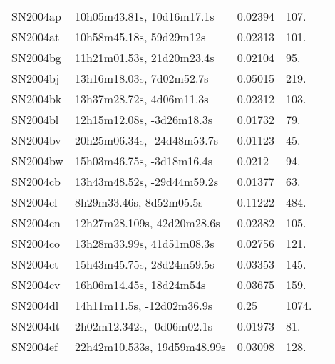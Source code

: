 \begin{longtable}{lllll}
         SN2004ap &      10h05m43.81s, 10d16m17.1s &  0.02394 &           107. &    \citet{1999PASP..111..438F} \\
         SN2004at &        10h58m45.18s, 59d29m12s &  0.02313 &           101. &    \citet{1985BICDS..29...87K} \\
         SN2004bg &      11h21m01.53s, 21d20m23.4s &  0.02104 &            95. &    \citet{1991RC3.9.C...0000d} \\
         SN2004bj &       13h16m18.03s, 7d02m52.7s &  0.05015 &           219. &    \citet{1998ApJS..119..277G} \\
         SN2004bk &       13h37m28.72s, 4d06m11.3s &  0.02312 &           103. &    \citet{2004SDSS2.C...0000:} \\
         SN2004bl &      12h15m12.08s, -3d26m18.3s &  0.01732 &            79. &    \citet{1996ApJS..107...97M} \\
         SN2004bv &     20h25m06.34s, -24d48m53.7s &  0.01123 &            45. &    \citet{2008MNRAS.386..963S} \\
         SN2004bw &      15h03m46.75s, -3d18m16.4s &   0.0212 &            94. &  \citet{1998AandAS..130..333T} \\
         SN2004cb &     13h43m48.52s, -29d44m59.2s &  0.01377 &            63. &  \citet{2005AandA...435..459H} \\
         SN2004cl &        8h29m33.46s, 8d52m05.5s &  0.11222 &           484. &    \citet{2005SDSS4.C...0000:} \\
         SN2004cn &     12h27m28.109s, 42d20m28.6s &  0.02382 &           105. &    \citet{2005SDSS4.C...0000:} \\
         SN2004co &      13h28m33.99s, 41d51m08.3s &  0.02756 &           121. &    \citet{2005SDSS4.C...0000:} \\
         SN2004ct &      15h43m45.75s, 28d24m59.5s &  0.03353 &           145. &    \citet{1995AJ....109.1458R} \\
         SN2004cv &        16h06m14.45s, 18d24m54s &  0.03675 &           159. &    \citet{1991RC3.9.C...0000d} \\
         SN2004dl &      14h11m11.5s, -12d02m36.9s &     0.25 &          1074. &    \citet{2004IAUC.8377C...1R} \\
         SN2004dt &      2h02m12.342s, -0d06m02.1s &  0.01973 &            81. &  \citet{1998AandAS..130..333T} \\
         SN2004ef &    22h42m10.533s, 19d59m48.99s &  0.03098 &           128. &    \citet{2004AJ....128.2080O} \\

\end{longtable}
